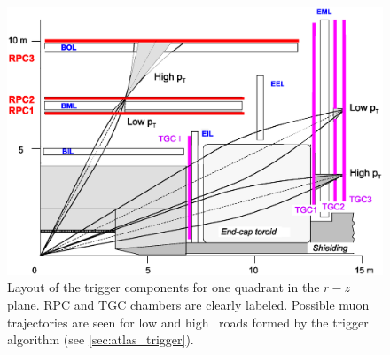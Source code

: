 \begin{figure}[tb]
\centering
\includegraphics[width=.95\textwidth]{figures/atlas/ms_trigger_layout.eps}
\caption{Layout of the trigger components for one quadrant
in the $r-z$ plane. RPC and TGC chambers are clearly labeled. Possible
muon trajectories are seen for low and high \pt~roads formed
by the trigger algorithm (see \sec\ref{sec:atlas_trigger}).}
\label{fig:atlas_ms_trigger_layout}
\end{figure}

